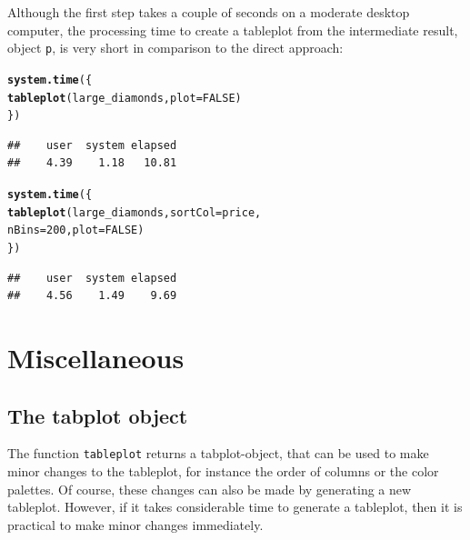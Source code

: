 \documentclass[11pt, fleqn, a4paper]{article}\usepackage{graphicx, color}
\makeatletter
\newcommand{\hlfunctioncall}[1]{\textcolor[rgb]{0.501960784313725,0,0.329411764705882}{\textbf{#1}}}%
\newenvironment{kframe}{%
 \def\at@end@of@kframe{}%
 \ifinner\ifhmode%
  \def\at@end@of@kframe{\end{minipage}}%
  \begin{minipage}{\columnwidth}%
 \fi\fi%
 \def\FrameCommand##1{\hskip\@totalleftmargin \hskip-\fboxsep
 \colorbox{shadecolor}{##1}\hskip-\fboxsep
     \hskip-\linewidth \hskip-\@totalleftmargin \hskip\columnwidth}%
 \MakeFramed {\advance\hsize-\width
   \@totalleftmargin\z@ \linewidth\hsize
   \@setminipage}}%
 {\par\unskip\endMakeFramed%
 \at@end@of@kframe}
\newenvironment{knitrout}{}{} %
\makeatother
\begin{document}
Although the first step takes a couple of seconds on a moderate desktop computer, the processing time to create a tableplot from the intermediate result, object {\tt p}, is very short in comparison to the direct approach:


\begin{knitrout}
\color{fgcolor}\begin{kframe}
\begin{alltt}
\hlfunctioncall{system.time}(\{
    \hlfunctioncall{tableplot}(large_diamonds, plot = FALSE)
\})
\end{alltt}
\end{kframe}

\begin{kframe}\begin{verbatim}
##    user  system elapsed 
##    4.39    1.18   10.81
\end{verbatim}
\begin{alltt}

\hlfunctioncall{system.time}(\{
    \hlfunctioncall{tableplot}(large_diamonds, sortCol = price, 
        nBins = 200, plot = FALSE)
\})
\end{alltt}
\end{kframe}

\begin{kframe}\begin{verbatim}
##    user  system elapsed 
##    4.56    1.49    9.69
\end{verbatim}
\end{kframe}
\end{knitrout}



\section{Miscellaneous}

\subsection{The tabplot object}\label{sectab}

The function {\tt tableplot} returns a tabplot-object, that can be used to make minor changes to the tableplot, for instance the order of columns or the color palettes. Of course, these changes can also be made by generating a new tableplot. However, if it takes considerable time to generate a tableplot, then it is practical to make minor changes immediately.
\end{document}
